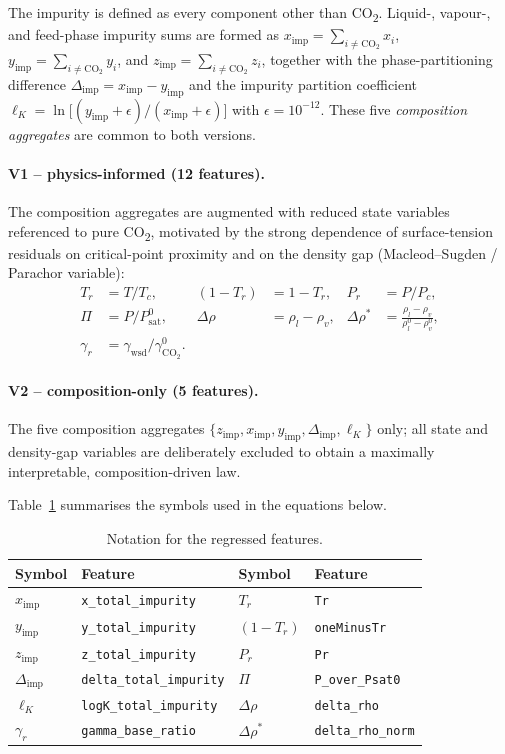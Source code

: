 \documentclass[11pt]{article}
\newcommand{\xim}{x_{\mathrm{imp}}}
\newcommand{\yim}{y_{\mathrm{imp}}}
\newcommand{\zim}{z_{\mathrm{imp}}}
\newcommand{\dimp}{\Delta_{\mathrm{imp}}}
\newcommand{\lK}{\ell_K}
\newcommand{\Tr}{T_r}
\newcommand{\Prr}{P_r}
\newcommand{\omTr}{(1-T_r)}
\newcommand{\Pir}{\Pi}              %
\newcommand{\gr}{\gamma_r}
\newcommand{\drho}{\Delta\rho}
\newcommand{\drhon}{\Delta\rho^{\!*}}
\begin{document}
The impurity is defined as every component other than CO\textsubscript{2}.
Liquid-, vapour-, and feed-phase impurity sums are formed as
$\xim=\sum_{i\neq\mathrm{CO_2}}x_i$,
$\yim=\sum_{i\neq\mathrm{CO_2}}y_i$, and
$\zim=\sum_{i\neq\mathrm{CO_2}}z_i$, together with the
phase-partitioning difference $\dimp=\xim-\yim$ and the impurity partition
coefficient $\lK=\ln\!\bigl[(\yim+\epsilon)/(\xim+\epsilon)\bigr]$ with
$\epsilon=10^{-12}$. These five \emph{composition aggregates} are common to
both versions.

\paragraph{V1 -- physics-informed (12 features).}
The composition aggregates are augmented with reduced state variables
referenced to pure CO\textsubscript{2}, motivated by the strong dependence of
surface-tension residuals on critical-point proximity and on the density gap
(Macleod--Sugden / Parachor variable):
\begin{align*}
  \Tr      &= T/T_{c}, &
  \omTr    &= 1-\Tr, &
  \Prr      &= P/P_{c}, \\
  \Pir     &= P/P_{\mathrm{sat}}^{0}, &
  \drho    &= \rho_l-\rho_v, &
  \drhon   &= \frac{\rho_l-\rho_v}{\rho_l^{0}-\rho_v^{0}}, \\
  \gr      &= \gamma_{\mathrm{wsd}}/\gamma^{0}_{\mathrm{CO_2}}. & & & &
\end{align*}

\paragraph{V2 -- composition-only (5 features).}
The five composition aggregates $\{\zim,\xim,\yim,\dimp,\lK\}$ only;
all state and density-gap variables are deliberately excluded to obtain a
maximally interpretable, composition-driven law.

Table~\ref{tab:notation} summarises the symbols used in the equations below.

\begin{table}[h]
\centering
\caption{Notation for the regressed features.}
\label{tab:notation}
\small
\begin{tabular}{ll@{\hskip 2.2em}ll}
\toprule
Symbol & Feature & Symbol & Feature \\
\midrule
$\xim$   & \texttt{x\_total\_impurity}     & $\Tr$    & \texttt{Tr} \\
$\yim$   & \texttt{y\_total\_impurity}     & $\omTr$  & \texttt{oneMinusTr} \\
$\zim$   & \texttt{z\_total\_impurity}     & $\Prr$    & \texttt{Pr} \\
$\dimp$   & \texttt{delta\_total\_impurity} & $\Pir$   & \texttt{P\_over\_Psat0} \\
$\lK$    & \texttt{logK\_total\_impurity}  & $\drho$  & \texttt{delta\_rho} \\
$\gr$    & \texttt{gamma\_base\_ratio}     & $\drhon$ & \texttt{delta\_rho\_norm} \\
\bottomrule
\end{tabular}
\end{table}
\end{document}
